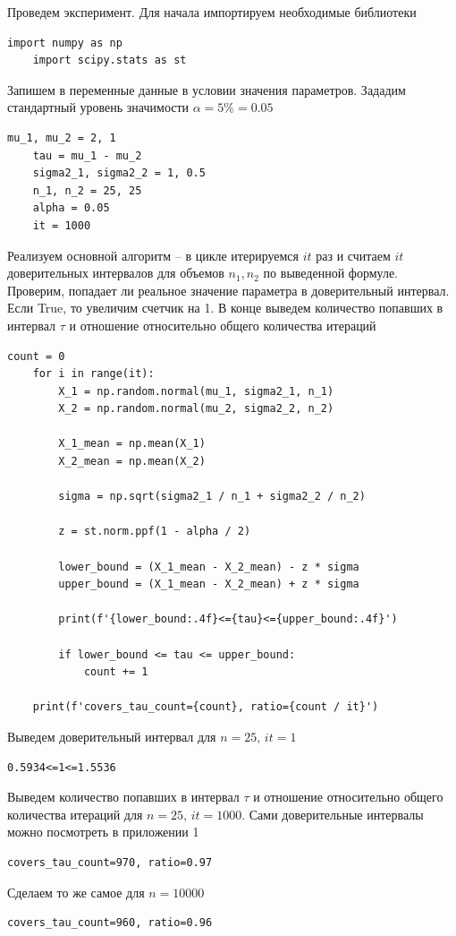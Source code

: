 \documentclass[a4paper, 12pt]{article}
\begin{document}
    Проведем эксперимент. Для начала импортируем необходимые библиотеки
    \begin{lstlisting}[label=imps1, caption={Импортирование необходимых библиотек}]
    import numpy as np
    import scipy.stats as st
    \end{lstlisting}
    Запишем в переменные данные в условии значения параметров. Зададим стандартный уровень значимости $\alpha=5\%=0.05$
    \begin{lstlisting}[label=vars, caption={Задаем данные по условию}]
    mu_1, mu_2 = 2, 1
    tau = mu_1 - mu_2
    sigma2_1, sigma2_2 = 1, 0.5
    n_1, n_2 = 25, 25
    alpha = 0.05
    it = 1000
    \end{lstlisting}
    Реализуем основной алгоритм -- в цикле итерируемся $it$ раз и считаем $it$ доверительных интервалов для объемов $n_1,n_2$ по выведенной формуле.
    Проверим, попадает ли реальное значение параметра в доверительный интервал. Если True, то увеличим счетчик на 1. В конце
    выведем количество попавших в интервал $\tau$ и отношение относительно общего количества итераций
    \begin{lstlisting}[label=code1, caption={Код для подсчета доверительных интервалов и кол-ва попаданий}]
    count = 0
    for i in range(it):
        X_1 = np.random.normal(mu_1, sigma2_1, n_1)
        X_2 = np.random.normal(mu_2, sigma2_2, n_2)
        
        X_1_mean = np.mean(X_1)
        X_2_mean = np.mean(X_2)
        
        sigma = np.sqrt(sigma2_1 / n_1 + sigma2_2 / n_2)
        
        z = st.norm.ppf(1 - alpha / 2)
        
        lower_bound = (X_1_mean - X_2_mean) - z * sigma
        upper_bound = (X_1_mean - X_2_mean) + z * sigma

        print(f'{lower_bound:.4f}<={tau}<={upper_bound:.4f}')
            
        if lower_bound <= tau <= upper_bound:
            count += 1
        
    print(f'covers_tau_count={count}, ratio={count / it}')
    \end{lstlisting}
    Выведем доверительный интервал для $n=25,\,it=1$
    \begin{lstlisting}[label=res1, caption={Посчитанный доверительный интервал}]
    0.5934<=1<=1.5536
    \end{lstlisting}
    Выведем количество попавших в интервал $\tau$ и отношение относительно общего количества итераций
    для $n=25,\,it=1000$. Сами доверительные интервалы можно посмотреть в приложении 1
    \begin{lstlisting}[label=n25, caption={95-\% доверительный интервал для $n=25$}]
    covers_tau_count=970, ratio=0.97
    \end{lstlisting}
    Сделаем то же самое для $n=10000$
    \begin{lstlisting}[label=n10000, caption={95-\% доверительный интервал для $n=10000$}]
    covers_tau_count=960, ratio=0.96
    \end{lstlisting}
\end{document}
